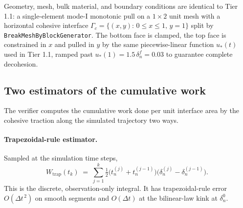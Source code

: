 Geometry, mesh, bulk material, and boundary conditions are identical to
Tier 1.1: a single-element mode-I monotonic pull on a $1\times 2$ unit
mesh with a horizontal cohesive interface $\Gamma_c=\{(x,y):\,0\le x\le1,\,
y=1\}$ split by \texttt{BreakMeshByBlockGenerator}.
The bottom face is clamped, the top face is constrained in $x$ and pulled
in $y$ by the same piecewise-linear function $u_*(t)$ used in Tier 1.1,
ramped past $u_*(1)=1.5\,\delta_n^{f}=0.03$ to guarantee complete
decohesion.

\subsection{Two estimators of the cumulative work}

The verifier computes the cumulative work done per unit interface area by
the cohesive traction along the simulated trajectory two ways.

\paragraph{Trapezoidal-rule estimator.}
Sampled at the simulation time steps,
\begin{equation}
W_{\text{trap}}(t_k) \;=\;
\sum_{j=1}^{k} \tfrac{1}{2}\bigl(t_n^{(j)}+t_n^{(j-1)}\bigr)
                       \bigl(\delta_n^{(j)}-\delta_n^{(j-1)}\bigr).
\label{eq:Wtrap}
\end{equation}
This is the discrete, observation-only integral. It has trapezoidal-rule
error $O(\Delta t^{\,2})$ on smooth segments and $O(\Delta t)$ at the
bilinear-law kink at $\delta_n^{0}$.

